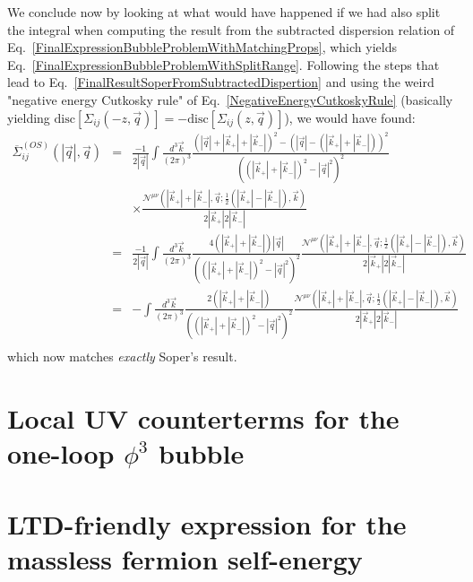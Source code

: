 \documentclass[11pt]{article}
\begin{document}
We conclude now by looking at what would have happened if we had also split the integral when computing the result from the subtracted dispersion relation of Eq.~\ref{FinalExpressionBubbleProblemWithMatchingProps}, which yields Eq.~\ref{FinalExpressionBubbleProblemWithSplitRange}.
Following the steps that lead to Eq.~\ref{FinalResultSoperFromSubtractedDispertion} and using the weird "negative energy Cutkosky rule" of Eq.~\ref{NegativeEnergyCutkoskyRule} (basically yielding $\textrm{disc} \left[ \Sigma_{ij}(-z, \vec{q}) \right]=-\textrm{disc} \left[ \Sigma_{ij}(z, \vec{q}) \right]$), we would have found:
\begin{eqnarray}
\overline{\Sigma}_{ij}^{(OS)}(|\vec{q}|, \vec{q}) &=&
 \frac{-1}{2 |\vec{q}|} 
\int \frac{d^3 \vec{k}}{(2\pi)^3} 
\frac{ 
\left( |\vec{q}| + |\vec{k}_{+}|+|\vec{k}_{-}| \right)^2 - \left( |\vec{q}| - (|\vec{k}_{+}|+|\vec{k}_{-}|) \right)^2
}{\left( \left( |\vec{k}_{+}|+|\vec{k}_{-}| \right)^2 - |\vec{q}|^2 \right)^2 }\nonumber\\
&&\times
\frac{ \mathcal{N}^{\mu\nu} \left(  |\vec{k}_{+}|+|\vec{k}_{-}| , \vec{q} ; \frac{1}{2}(|\vec{k}_{+}|-|\vec{k}_{-}|), \vec{k} \right) } {2|\vec{k}_{+}|2|\vec{k}_{-}|}
\nonumber \\
&=&
 \frac{-1}{2 |\vec{q}|} 
\int \frac{d^3 \vec{k}}{(2\pi)^3} 
\frac{ 
4 ( |\vec{k}_{+}|+|\vec{k}_{-}| ) |\vec{q}|
}{\left( \left( |\vec{k}_{+}|+|\vec{k}_{-}| \right)^2 - |\vec{q}|^2 \right)^2 }
\frac{ \mathcal{N}^{\mu\nu} \left(  |\vec{k}_{+}|+|\vec{k}_{-}| , \vec{q} ; \frac{1}{2}(|\vec{k}_{+}|-|\vec{k}_{-}|), \vec{k} \right) } {2|\vec{k}_{+}|2|\vec{k}_{-}|} \nonumber \\
&=&
 - 
\int \frac{d^3 \vec{k}}{(2\pi)^3} 
\frac{ 
2 ( |\vec{k}_{+}|+|\vec{k}_{-}| )
}{\left( \left( |\vec{k}_{+}|+|\vec{k}_{-}| \right)^2 - |\vec{q}|^2 \right)^2 }
\frac{ \mathcal{N}^{\mu\nu} \left(  |\vec{k}_{+}|+|\vec{k}_{-}| , \vec{q} ; \frac{1}{2}(|\vec{k}_{+}|-|\vec{k}_{-}|), \vec{k} \right) } {2|\vec{k}_{+}|2|\vec{k}_{-}|} \nonumber \\
\label{FinalResultMatchingSoperFromSubtractedDispersionRelation}
\end{eqnarray}
which now matches \emph{exactly} Soper's result.

\section{Local UV counterterms for the one-loop $\phi^3$ bubble}
\label{UVCT}

\section{LTD-friendly expression for the massless fermion self-energy}
\label{MasslessFermionBubble}
\end{document}
